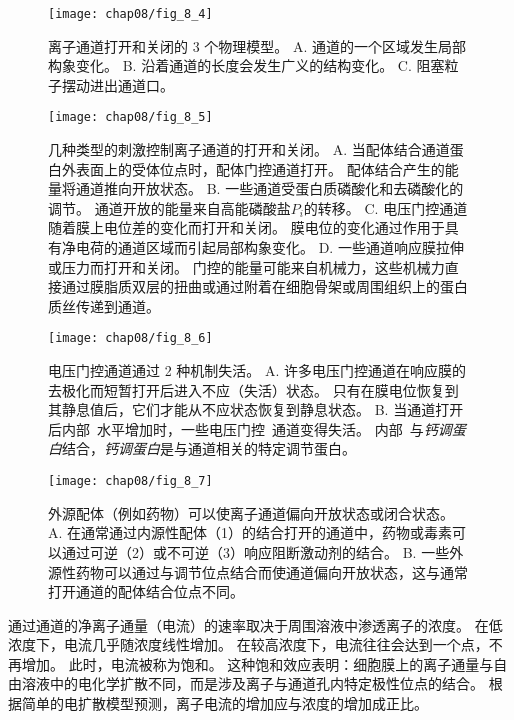 \begin{figure}[htbp]
	\centering
	\texttt{[image: chap08/fig\_8\_4]}
	\caption{离子通道打开和关闭的 3 个物理模型。
		A. 通道的一个区域发生局部构象变化。
		B. 沿着通道的长度会发生广义的结构变化。
		C. 阻塞粒子摆动进出通道口。}
	\label{fig:8_4}
\end{figure}


\begin{figure}[htbp]
	\centering
	\texttt{[image: chap08/fig\_8\_5]}
	\caption{几种类型的刺激控制离子通道的打开和关闭。
		A. 当配体结合通道蛋白外表面上的受体位点时，配体门控通道打开。
		配体结合产生的能量将通道推向开放状态。
		B. 一些通道受蛋白质磷酸化和去磷酸化的调节。
		通道开放的能量来自高能磷酸盐$P_i$的转移。
		C. 电压门控通道随着膜上电位差的变化而打开和关闭。
		膜电位的变化通过作用于具有净电荷的通道区域而引起局部构象变化。
		D. 一些通道响应膜拉伸或压力而打开和关闭。
		门控的能量可能来自机械力，这些机械力直接通过膜脂质双层的扭曲或通过附着在细胞骨架或周围组织上的蛋白质丝传递到通道。}
	\label{fig:8_5}
\end{figure}


\begin{figure}[htbp]
	\centering
	\texttt{[image: chap08/fig\_8\_6]}
	\caption{电压门控通道通过 2 种机制失活。
		A. 许多电压门控通道在响应膜的去极化而短暂打开后进入不应（失活）状态。
		只有在膜电位恢复到其静息值后，它们才能从不应状态恢复到静息状态。
		B. 当通道打开后内部~水平增加时，一些电压门控~通道变得失活。
		内部~与\textit{钙调蛋白}结合，\textit{钙调蛋白}是与通道相关的特定调节蛋白。}
	\label{fig:8_6}
\end{figure}


\begin{figure}[htbp]
	\centering
	\texttt{[image: chap08/fig\_8\_7]}
	\caption{外源配体（例如药物）可以使离子通道偏向开放状态或闭合状态。
		A. 在通常通过内源性配体（1）的结合打开的通道中，药物或毒素可以通过可逆（2）或不可逆（3）响应阻断激动剂的结合。
		B. 一些外源性药物可以通过与调节位点结合而使通道偏向开放状态，这与通常打开通道的配体结合位点不同。}
	\label{fig:8_7}
\end{figure}


通过通道的净离子通量（电流）的速率取决于周围溶液中渗透离子的浓度。
在低浓度下，电流几乎随浓度线性增加。
在较高浓度下，电流往往会达到一个点，不再增加。
此时，电流被称为饱和。
这种饱和效应表明：细胞膜上的离子通量与自由溶液中的电化学扩散不同，而是涉及离子与通道孔内特定极性位点的结合。
根据简单的电扩散模型预测，离子电流的增加应与浓度的增加成正比。


